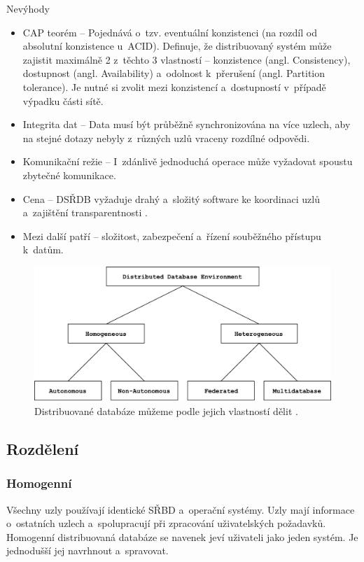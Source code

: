 \noindent Nevýhody
\begin{itemize}
\item CAP teorém -- Pojednává o~tzv. eventuální konzistenci (na rozdíl od absolutní konzistence u~ACID). Definuje, že distribuovaný systém může zajistit maximálně 2 z~těchto 3 vlastností -- konzistence (angl. Consistency), dostupnost (angl. Availability) a~odolnost k~přerušení (angl. Partition tolerance). Je nutné si zvolit mezi konzistencí a~dostupností v~případě výpadku části sítě.

\item Integrita dat -- Data musí být průběžně synchronizována na více uzlech, aby na stejné dotazy nebyly z~různých uzlů vraceny rozdílné odpovědi.

\item Komunikační režie -- I~zdánlivě jednoduchá operace může vyžadovat spoustu zbytečné komunikace.

\item Cena -- DSŘDB vyžaduje drahý a~složitý software ke koordinaci uzlů a~zajištění transparentnosti \cite{distributedDBMS}.

\item Mezi další patří -- složitost, zabezpečení a~řízení souběžného přístupu k~datům.
\end{itemize}

\begin{figure}[!h]
  \centering
  \includegraphics[width=14.2cm]{template-fig/DistributedDatabasesClassification.pdf}
  \caption{Distribuované databáze můžeme podle jejich vlastností dělit \cite{distributedDBMS}.}
  \label{FIG_DivDistrDB}
\end{figure}

\subsection{Rozdělení}
\subsubsection{Homogenní}
Všechny uzly používají identické SŘBD a~operační systémy. Uzly mají informace o~ostatních uzlech a~spolupracují při zpracování uživatelských požadavků. Homogenní distribuovaná databáze se navenek jeví uživateli jako jeden systém. Je jednodušší jej navrhnout a~spravovat.

